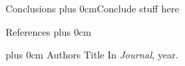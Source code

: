 \documentclass[final,hyperref={pdfpagelabels=false}]{beamer}
\renewcommand{\raggedright}{\leftskip=0.5cm \rightskip=0.5cm plus 0cm}
\begin{document}
\begin{frame}{}
\begin{columns}[t]
\begin{column}{.48\linewidth}
        \begin{block}{\Large Conclusions}
          \raggedright Conclude stuff here
        \end{block}
        \begin{block}{References}
          \raggedright
          \footnotesize
          \begin{thebibliography}{2}
            \raggedright
            Authors
            \newblock Title
            \newblock In \emph{Journal}, year.
          \end{thebibliography}
        \end{block}
      \end{column}
    \end{columns}
  \end{frame}
\end{document}
